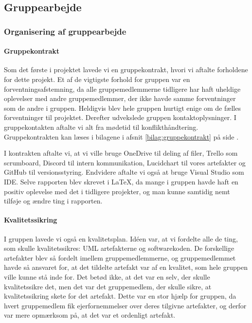 \subsection{Gruppearbejde}
\subsubsection{Organisering af gruppearbejde}

\paragraph*{Gruppekontrakt}

Som det første i projektet lavede vi en gruppekontrakt, 
hvori vi aftalte forholdene for dette projekt.
Et af de vigtigste forhold for gruppen var en forventningsafstemning, da alle gruppemedlemmerne tidligere har haft uheldige oplevelser med andre gruppemedlemmer, der ikke havde samme forventninger som de andre i gruppen.
Heldigvis blev hele gruppen hurtigt enige om de fælles forventninger til projektet.
Derefter udvekslede gruppen kontaktoplysninger.
I gruppekontakten aftalte vi alt fra mødetid til konflikthåndtering.
Gruppekontrakten kan læses i bilagene i afsnit \ref{bilag:gruppekontrakt} på side \pageref{bilag:gruppekontrakt}.


I kontrakten aftalte vi, at vi ville bruge OneDrive til deling af filer, Trello som scrumboard, Discord til intern kommunikation, Lucidchart til vores artefakter og GitHub til versionsstyring. 
Endvidere aftalte vi også at bruge Visual Studio som IDE.
Selve rapporten blev skrevet i \LaTeX, da mange i gruppen havde haft en positiv oplevelse med det i tidligere projekter, og man kunne samtidig nemt tilføje og ændre ting i rapporten.

\paragraph*{Kvalitetssikring}
I gruppen lavede vi også en kvalitetsplan.
Idéen var, at vi fordelte alle de ting, som skulle kvalitetssikres: UML artefakterne og softwarekoden.
De forskellige artefakter blev så fordelt imellem gruppemedlemmerne, og gruppemedlemmet havde så ansvaret for, at det tildelte artefakt var af en kvalitet, som hele gruppen ville kunne stå inde for.
Det betød ikke, at det var en selv, der skulle kvalitetssikre det, men det var det gruppemedlem, der skulle sikre, at kvalitetssikring skete for det artefakt.
Dette var en stor hjælp for gruppen, da hvert gruppemedlem fik ejerfornemmelser over deres tilgivne artefakter, og derfor var mere opmærksom på, at det var et ordenligt artefakt.

